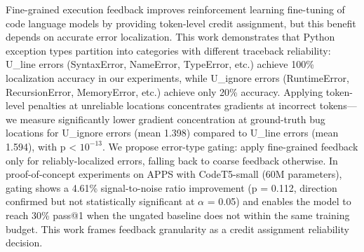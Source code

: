
Fine-grained execution feedback improves reinforcement learning fine-tuning of code language models by providing token-level credit assignment, but this benefit depends on accurate error localization. This work demonstrates that Python exception types partition into categories with different traceback reliability: U\_line errors (SyntaxError, NameError, TypeError, etc.) achieve 100\% localization accuracy in our experiments, while U\_ignore errors (RuntimeError, RecursionError, MemoryError, etc.) achieve only 20\% accuracy. Applying token-level penalties at unreliable locations concentrates gradients at incorrect tokens---we measure significantly lower gradient concentration at ground-truth bug locations for U\_ignore errors (mean 1.398) compared to U\_line errors (mean 1.594), with p < $10^{-13}$. We propose error-type gating: apply fine-grained feedback only for reliably-localized errors, falling back to coarse feedback otherwise. In proof-of-concept experiments on APPS with CodeT5-small (60M parameters), gating shows a 4.61\% signal-to-noise ratio improvement (p = 0.112, direction confirmed but not statistically significant at $\alpha$ = 0.05) and enables the model to reach 30\% pass@1 when the ungated baseline does not within the same training budget. This work frames feedback granularity as a credit assignment reliability decision.


